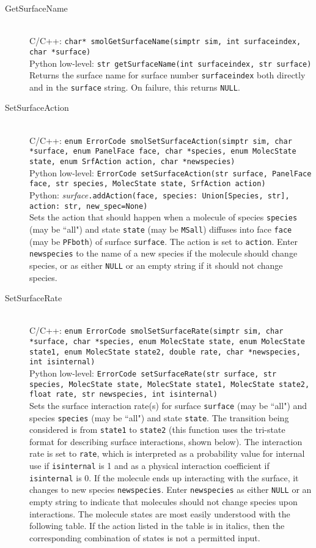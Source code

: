 \documentclass {book}
\newcommand {\ttt} {\texttt}
\begin{document}
\begin{description}
\item[GetSurfaceName]
\hfill \\
C/C++: \ttt{char* smolGetSurfaceName(simptr sim, int surfaceindex, char *surface)}\\
Python low-level: \ttt{str getSurfaceName(int surfaceindex, str surface)}\\
Returns the surface name for surface number \ttt{surfaceindex} both directly and in the \ttt{surface} string. On failure, this returns \ttt{NULL}.

\item[SetSurfaceAction]
\hfill \\
C/C++: \ttt{enum ErrorCode smolSetSurfaceAction(simptr sim, char *surface, enum PanelFace face, char *species, enum MolecState state, enum SrfAction action, char *newspecies)}\\
Python low-level: \ttt{ErrorCode setSurfaceAction(str surface, PanelFace face, str species, MolecState state, SrfAction action)}\\
Python: \textit{surface}\ttt{.addAction(face, species: Union[Species, str], action: str, new\_spec=None)}\\
Sets the action that should happen when a molecule of species \ttt{species} (may be ``all") and state \ttt{state} (may be \ttt{MSall}) diffuses into face \ttt{face} (may be \ttt{PFboth}) of surface \ttt{surface}. The action is set to \ttt{action}. Enter \ttt{newspecies} to the name of a new species if the molecule should change species, or as either \ttt{NULL} or an empty string if it should not change species.

\item[SetSurfaceRate]
\hfill \\
C/C++: \ttt{enum ErrorCode smolSetSurfaceRate(simptr sim, char *surface, char *species, enum MolecState state, enum MolecState state1, enum MolecState state2, double rate, char *newspecies, int isinternal)}\\
Python low-level: \ttt{ErrorCode setSurfaceRate(str surface, str species, MolecState state, MolecState state1, MolecState state2, float rate, str newspecies, int isinternal)}\\
Sets the surface interaction rate(s) for surface \ttt{surface} (may be ``all") and species \ttt{species} (may be ``all") and state \ttt{state}. The transition being considered is from \ttt{state1} to \ttt{state2} (this function uses the tri-state format for describing surface interactions, shown below). The interaction rate is set to \ttt{rate}, which is interpreted as a probability value for internal use if \ttt{isinternal} is 1 and as a physical interaction coefficient if \ttt{isinternal} is 0. If the molecule ends up interacting with the surface, it changes to new species \ttt{newspecies}. Enter \ttt{newspecies} as either \ttt{NULL} or an empty string to indicate that molecules should not change species upon interactions. The molecule states are most easily understood with the following table. If the action listed in the table is in italics, then the corresponding combination of states is not a permitted input.


\end{description}
\end{document}
